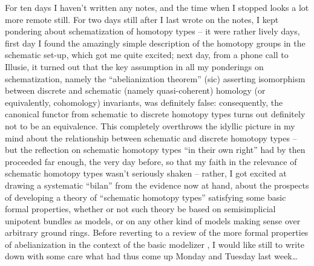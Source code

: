 \label{sec:116}%
For ten days I haven't written any notes, and the time when I stopped
looks a lot more remote still. For two days still after I last wrote
on the notes, I kept pondering about schematization of homotopy types
-- it were rather lively days, first day I found the amazingly simple
description of the homotopy groups in the schematic set-up, which got
me quite excited; next day, from a phone call to Illusie, it turned
out that the key assumption in all my ponderings on schematization,
namely the ``abelianization theorem'' (sic) asserting isomorphism
between discrete and schematic (namely quasi-coherent) homology (or
equivalently, cohomology) invariants, was definitely false:
consequently, the canonical functor from schematic to discrete
homotopy types turns out definitely not to be an equivalence. This
completely overthrows the idyllic picture in my mind about the
relationship between schematic and discrete homotopy types -- but the
reflection on schematic homotopy types ``in their own right'' had by
then proceeded far enough, the very day before, so that my faith in
the relevance of schematic homotopy types wasn't seriously shaken --
rather, I got excited at drawing a systematic
``bilan'' from
the evidence now at hand, about the prospects of developing a theory
of ``schematic homotopy types'' satisfying some basic formal
properties, whether or not such theory be based on semisimplicial
unipotent bundles as models, or on any other kind of models making
sense over arbitrary ground rings. Before reverting to a review of the
more formal properties of abelianization in the context of the basic
modelizer \Cat, I would like still to write down with some care what
had thus come up Monday and Tuesday last week\dots


